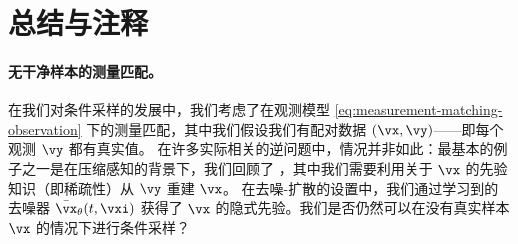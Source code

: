\documentclass[../../book-main.tex]{subfiles}
\begin{document}




\section{总结与注释}
\paragraph{无干净样本的测量匹配。} 在我们对条件采样的发展中，我们考虑了在观测模型 \eqref{eq:measurement-matching-observation} 下的测量匹配，其中我们假设我们有配对数据 $(\vx, \vy)$——即每个观测 $\vy$ 都有真实值。
在许多实际相关的逆问题中，情况并非如此：最基本的例子之一是在压缩感知的背景下，我们回顾了 ，其中我们需要利用关于 $\vx$ 的先验知识（即稀疏性）从 $\vy$ 重建 $\vx$。
在去噪-扩散的设置中，我们通过学习到的去噪器 $\bar{\vx}_{\theta}(t, \vxi)$ 获得了 $\vx$ 的隐式先验。我们是否仍然可以在没有真实样本 $\vx$ 的情况下进行条件采样？
\end{document}
